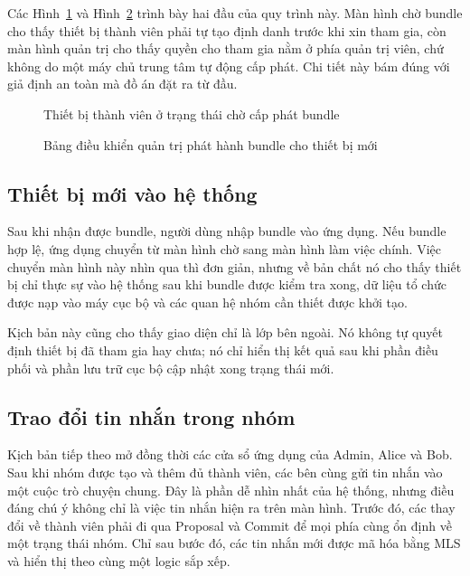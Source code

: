 \documentclass[../DoAn.tex]{subfiles}
\begin{document}
Các Hình~\ref{fig:app_awaiting_bundle} và Hình~\ref{fig:app_issue_bundle} trình bày hai đầu của quy trình này. Màn hình chờ bundle cho thấy thiết bị thành viên phải tự tạo định danh trước khi xin tham gia, còn màn hình quản trị cho thấy quyền cho tham gia nằm ở phía quản trị viên, chứ không do một máy chủ trung tâm tự động cấp phát. Chi tiết này bám đúng với giả định an toàn mà đồ án đặt ra từ đầu.

	\begin{figure}[htbp]
		\centering
		\caption{Thiết bị thành viên ở trạng thái chờ cấp phát bundle}
		\label{fig:app_awaiting_bundle}
	\end{figure}

	\begin{figure}[htbp]
		\centering
		\caption{Bảng điều khiển quản trị phát hành bundle cho thiết bị mới}
		\label{fig:app_issue_bundle}
	\end{figure}

	\subsection{Thiết bị mới vào hệ thống}

Sau khi nhận được bundle, người dùng nhập bundle vào ứng dụng. Nếu bundle hợp lệ, ứng dụng chuyển từ màn hình chờ sang màn hình làm việc chính. Việc chuyển màn hình này nhìn qua thì đơn giản, nhưng về bản chất nó cho thấy thiết bị chỉ thực sự vào hệ thống sau khi bundle được kiểm tra xong, dữ liệu tổ chức được nạp vào máy cục bộ và các quan hệ nhóm cần thiết được khởi tạo.

Kịch bản này cũng cho thấy giao diện chỉ là lớp bên ngoài. Nó không tự quyết định thiết bị đã tham gia hay chưa; nó chỉ hiển thị kết quả sau khi phần điều phối và phần lưu trữ cục bộ cập nhật xong trạng thái mới.

	\subsection{Trao đổi tin nhắn trong nhóm}

Kịch bản tiếp theo mở đồng thời các cửa sổ ứng dụng của Admin, Alice và Bob. Sau khi nhóm được tạo và thêm đủ thành viên, các bên cùng gửi tin nhắn vào một cuộc trò chuyện chung. Đây là phần dễ nhìn nhất của hệ thống, nhưng điều đáng chú ý không chỉ là việc tin nhắn hiện ra trên màn hình. Trước đó, các thay đổi về thành viên phải đi qua Proposal và Commit để mọi phía cùng ổn định về một trạng thái nhóm. Chỉ sau bước đó, các tin nhắn mới được mã hóa bằng MLS và hiển thị theo cùng một logic sắp xếp.
\end{document}
